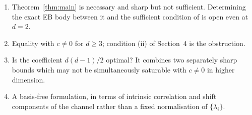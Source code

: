 \documentclass[11pt,a4paper]{article}
\theoremstyle{remark}
\begin{document}
\begin{enumerate}
\item Theorem~\ref{thm:main} is necessary and sharp but not sufficient. Determining the exact EB body between it and the sufficient condition of \cite{LamiGiovannetti} is open even at $d=2$.
\item Equality with $c\neq0$ for $d\ge3$; condition (ii) of Section~4 is the obstruction.
\item Is the coefficient $d(d-1)/2$ optimal? It combines two separately sharp bounds which may not be simultaneously saturable with $c\neq0$ in higher dimension.
\item A basis-free formulation, in terms of intrinsic correlation and shift components of the channel rather than a fixed normalisation of $\{\lambda_i\}$.
\end{enumerate}
\end{document}
